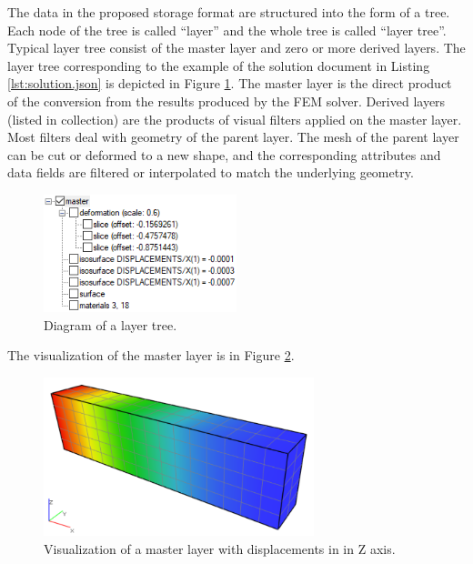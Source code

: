 The data in the proposed storage format are structured into the form of a tree. Each node of the tree is called ``layer'' and the whole tree is called ``layer tree''. Typical layer tree consist of the master layer and zero or more derived layers. The layer tree corresponding to the example of the solution document in Listing \ref{lst:solution.json} is depicted in Figure \ref{fig:layers-tree}. The master layer is the direct product of the conversion from the results produced by the FEM solver. Derived layers (listed in  collection) are the products of visual filters applied on the master layer. Most filters deal with geometry of the parent layer. The mesh of the parent layer can be cut or deformed to a new shape, and the corresponding attributes and data fields are filtered or interpolated to match the underlying geometry.

\begin{figure}[H]
    \centering
    \includegraphics[width=0.5\textwidth]{figures/chapter-data-management/layers-tree-diagram}
    \decoRule
    \caption{Diagram of a layer tree.}
    \label{fig:layers-tree}
\end{figure}

The visualization of the master layer is in Figure \ref{fig:beam-master-layer}.

\begin{figure}[H]
    \centering
    \includegraphics[width=0.7\textwidth]{figures/chapter-data-management/beam-master-layer}
    \decoRule
    \caption[Visualization of a master layer.]{Visualization of a master layer with displacements in in Z axis.}
    \label{fig:beam-master-layer}
\end{figure}

